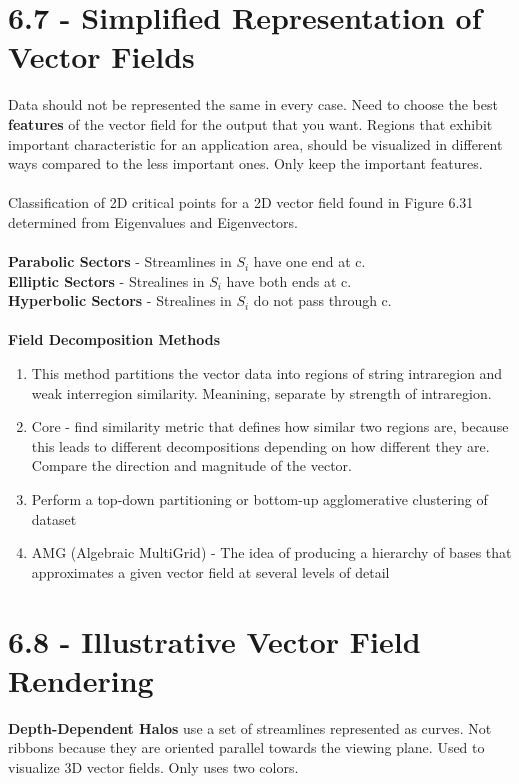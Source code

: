 \documentclass{article}
\begin{document}
\section*{6.7 - Simplified Representation of Vector Fields}
Data should not be represented the same in every case. Need to choose the best \textbf{features} of the vector field for the output that you want. Regions that exhibit important characteristic for an application area, should be visualized in different ways compared to the less important ones. Only keep the important features.
\\\\
Classification of 2D critical points for a 2D vector field found in Figure 6.31 determined from Eigenvalues and Eigenvectors.
\\\\
\textbf{Parabolic Sectors} - Streamlines in $S_i$ have one end at c.
\\
\textbf{Elliptic Sectors} - Strealines in $S_i$ have both ends at c.
\\
\textbf{Hyperbolic Sectors} - Strealines in $S_i$ do not pass through c.
\\
\\
\textbf{Field Decomposition Methods}
\begin{enumerate}
    \item This method partitions the vector data into regions of string intraregion and weak interregion similarity. Meanining, separate by strength of intraregion.
    \item Core - find similarity metric that defines how similar two regions are, because this leads to different decompositions depending on how different they are. Compare the direction and magnitude of the vector.
    \item Perform a top-down partitioning or bottom-up agglomerative clustering of dataset
    \item AMG (Algebraic MultiGrid) - The idea of producing a hierarchy of bases that approximates a given vector field at several levels of detail
\end{enumerate}


\section*{6.8 - Illustrative Vector Field Rendering} %
\textbf{Depth-Dependent Halos} use a set of streamlines represented as curves. Not ribbons because they are oriented parallel towards the viewing plane. Used to visualize 3D vector fields. Only uses two colors.
\end{document}
